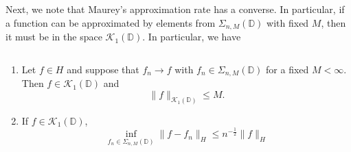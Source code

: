 Next, we note that Maurey's approximation rate has a converse. In particular, if a function can be approximated by elements from $\Sigma_{n,M}(\mathbb{D})$ with fixed $M$, then it must be in the space $\mathcal{K}_1(\mathbb{D})$. In particular, we have
\begin{theorem}
$\quad$
 \begin{enumerate}
 \item Let $f\in H$ and suppose that $f_n\rightarrow f$ with $f_n\in \Sigma_{n,M}(\mathbb{D})$ for a fixed $M < \infty$. Then $f\in \mathcal{K}_1(\mathbb{D})$ and
 \begin{equation}
  \|f\|_{\mathcal{K}_1(\mathbb{D})} \leq M.
  \end{equation}
  \item If $f\in \mathcal{K}_1(\mathbb{D})$,
  $$
  \inf_{f_n\in \Sigma_{n,M}(\mathbb{D})} \|f-f_n\|_H\le n^{-\frac12}\|f\|_{H}
  $$
  \end{enumerate}
 \end{theorem} 
